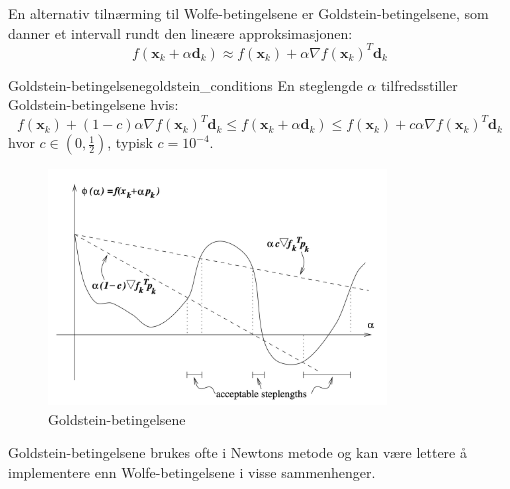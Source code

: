 En alternativ tilnærming til Wolfe-betingelsene er Goldstein-betingelsene, som danner et intervall rundt den lineære approksimasjonen:
\[
f(\symbf{x}_k + \alpha\symbf{d}_k) \approx f(\symbf{x}_k) + \alpha\nabla f(\symbf{x}_k)^T\symbf{d}_k
\]

\begin{definition}{Goldstein-betingelsene}{goldstein_conditions}
	En steglengde \(\alpha\) tilfredsstiller Goldstein-betingelsene hvis:
	\begin{equation}\label{eq:goldstein_conditions}
		f(\symbf{x}_k) + (1-c)\alpha\nabla f(\symbf{x}_k)^T\symbf{d}_k  \leq f(\symbf{x}_k + \alpha\symbf{d}_k) \leq f(\symbf{x}_k) + c\alpha\nabla f(\symbf{x}_k)^T\symbf{d}_k
	\end{equation}
	hvor \(c \in (0, \frac{1}{2})\), typisk \(c = 10^{-4}\).
\end{definition}
\begin{figure}[H]
	\centering
	\includegraphics[width=0.8\textwidth]{figures/goldstein_conditions.png}
	\caption{Goldstein-betingelsene}
	\label{fig:goldstein_conditions}
\end{figure}

Goldstein-betingelsene brukes ofte i Newtons metode og kan være lettere å implementere enn Wolfe-betingelsene i visse sammenhenger.

